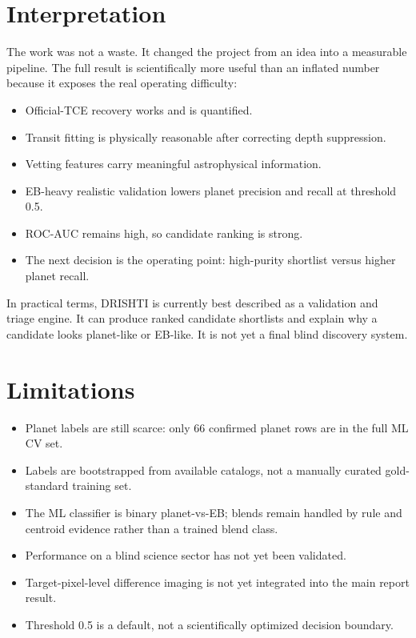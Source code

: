 \documentclass[11pt,a4paper]{article}
\begin{document}
\section{Interpretation}

The work was not a waste. It changed the project from an idea into a measurable pipeline. The full result is scientifically more useful than an inflated number because it exposes the real operating difficulty:

\begin{itemize}
  \item Official-TCE recovery works and is quantified.
  \item Transit fitting is physically reasonable after correcting depth suppression.
  \item Vetting features carry meaningful astrophysical information.
  \item EB-heavy realistic validation lowers planet precision and recall at threshold 0.5.
  \item ROC-AUC remains high, so candidate ranking is strong.
  \item The next decision is the operating point: high-purity shortlist versus higher planet recall.
\end{itemize}

In practical terms, DRISHTI is currently best described as a validation and triage engine. It can produce ranked candidate shortlists and explain why a candidate looks planet-like or EB-like. It is not yet a final blind discovery system.

\section{Limitations}

\begin{itemize}
  \item Planet labels are still scarce: only 66 confirmed planet rows are in the full ML CV set.
  \item Labels are bootstrapped from available catalogs, not a manually curated gold-standard training set.
  \item The ML classifier is binary planet-vs-EB; blends remain handled by rule and centroid evidence rather than a trained blend class.
  \item Performance on a blind science sector has not yet been validated.
  \item Target-pixel-level difference imaging is not yet integrated into the main report result.
  \item Threshold 0.5 is a default, not a scientifically optimized decision boundary.
\end{itemize}
\end{document}
